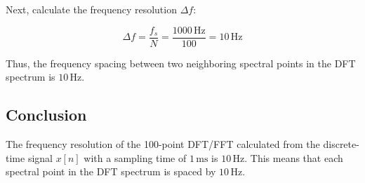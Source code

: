 Next, calculate the frequency resolution \( \Delta f \):

\[ \Delta f = \frac{f_s}{N} = \frac{1000 \, \text{Hz}}{100} = 10 \, \text{Hz} \]

Thus, the frequency spacing between two neighboring spectral points in the DFT spectrum is \( 10 \, \text{Hz} \).

\subsection*{Conclusion}
The frequency resolution of the 100-point DFT/FFT calculated from the discrete-time signal \( x[n] \) with a sampling time of \( 1 \, \text{ms} \) is \( 10 \, \text{Hz} \). This means that each spectral point in the DFT spectrum is spaced by \( 10 \, \text{Hz} \).
